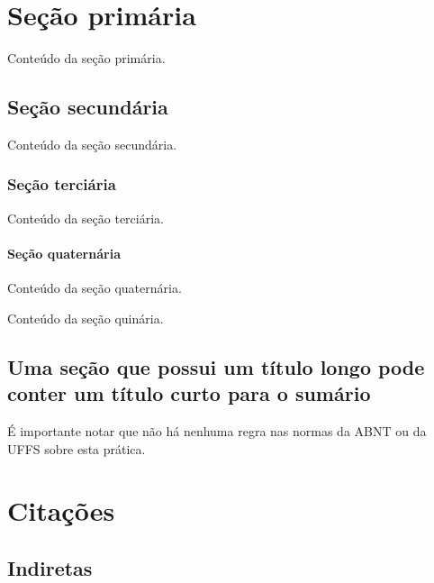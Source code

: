 \documentclass[serif, english, brazilian]{uffstex}
\begin{document}
\listoftables*
\cleardoublepage%

\tableofcontents*
\cleardoublepage%

\textual%

\chapter{Seção primária}

Conteúdo da seção primária.

\section{Seção secundária}

Conteúdo da seção secundária.

\subsection{Seção terciária}

Conteúdo da seção terciária.

\subsubsection{Seção quaternária}

Conteúdo da seção quaternária.


Conteúdo da seção quinária.

\section[Título curto]{Uma seção que possui um título longo
pode conter um título curto para o sumário}

É importante notar que não há nenhuma regra nas normas da ABNT ou da UFFS
sobre esta prática.

\chapter{Citações}

\section{Indiretas}
\end{document}
